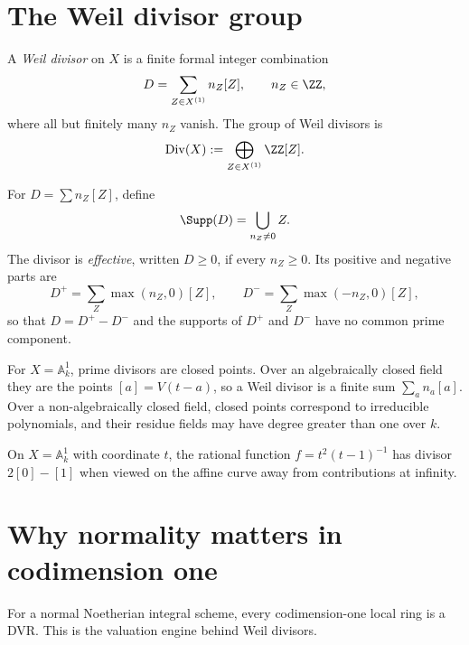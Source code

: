\section{The Weil divisor group}
\begin{definition}\label{def:vi39-weil}
A \emph{Weil divisor} on \(X\) is a finite formal integer combination
\[
 D=\sum_{Z\in X^{(1)}}n_Z[Z],\qquad n_Z\in\ZZ,
\]
where all but finitely many \(n_Z\) vanish.  The group of Weil divisors is
\[
 \Div(X):=\bigoplus_{Z\in X^{(1)}}\ZZ[Z].
\]
\end{definition}

\begin{definition}\label{def:vi39-support-effective}
For \(D=\sum n_Z[Z]\), define
\[
 \Supp(D)=\bigcup_{n_Z\ne0}Z.
\]
The divisor is \emph{effective}, written \(D\ge0\), if every \(n_Z\ge0\).  Its positive and negative parts are
\[
 D^+=\sum_Z\max(n_Z,0)[Z],\qquad
 D^-=\sum_Z\max(-n_Z,0)[Z],
\]
so that \(D=D^+-D^-\) and the supports of \(D^+\) and \(D^-\) have no common prime component.
\end{definition}



\begin{example}\label{ex:vi39-affine-line-group}
For \(X=\mathbb{A}^1_k\), prime divisors are closed points.  Over an algebraically closed field they are the points \([a]=V(t-a)\), so a Weil divisor is a finite sum \(\sum_a n_a[a]\).  Over a non-algebraically closed field, closed points correspond to irreducible polynomials, and their residue fields may have degree greater than one over \(k\).
\end{example}

\begin{example}\label{ex:vi39-expand-01}
On $X=\mathbb A^1_k$ with coordinate $t$, the rational function $f=t^2(t-1)^{-1}$ has divisor $2[0]-[1]$ when viewed on the affine curve away from contributions at infinity.
\end{example}
\section{Why normality matters in codimension one}
For a normal Noetherian integral scheme, every codimension-one local ring is a DVR.  This is the valuation engine behind Weil divisors.

